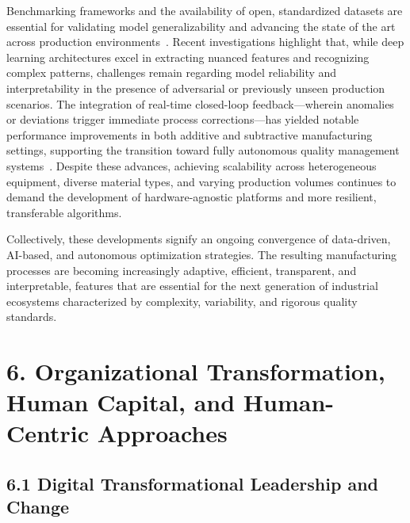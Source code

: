 \documentclass[11pt]{article}
\begin{document}
Benchmarking frameworks and the availability of open, standardized datasets are essential for validating model generalizability and advancing the state of the art across production environments~\cite{ref46,ref48,ref53,ref95}. Recent investigations highlight that, while deep learning architectures excel in extracting nuanced features and recognizing complex patterns, challenges remain regarding model reliability and interpretability in the presence of adversarial or previously unseen production scenarios. The integration of real-time closed-loop feedback—wherein anomalies or deviations trigger immediate process corrections—has yielded notable performance improvements in both additive and subtractive manufacturing settings, supporting the transition toward fully autonomous quality management systems~\cite{ref44,ref48,ref58}. Despite these advances, achieving scalability across heterogeneous equipment, diverse material types, and varying production volumes continues to demand the development of hardware-agnostic platforms and more resilient, transferable algorithms.

Collectively, these developments signify an ongoing convergence of data-driven, AI-based, and autonomous optimization strategies. The resulting manufacturing processes are becoming increasingly adaptive, efficient, transparent, and interpretable, features that are essential for the next generation of industrial ecosystems characterized by complexity, variability, and rigorous quality standards.

\section{6. Organizational Transformation, Human Capital, and Human-Centric Approaches}

\subsection{6.1 Digital Transformational Leadership and Change}
\end{document}
